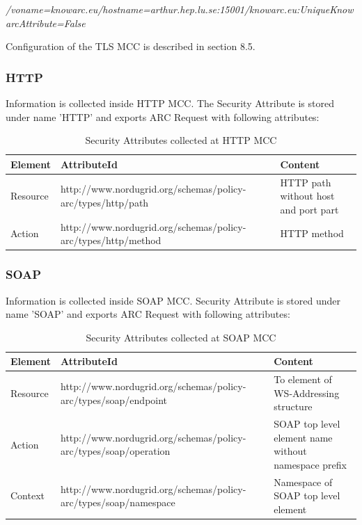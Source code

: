 \documentclass{article}                            %
\begin{document}
\emph{/voname=knowarc.eu/hostname=arthur.hep.lu.se:15001/knowarc.eu:UniqueKnowarcAttribute=False}

Configuration of the TLS MCC is described in section 8.5.



\subsubsection{HTTP} %
\label{subsubsec:sec_attr_HTTP}
Information is collected inside HTTP MCC. The Security Attribute is stored under name 'HTTP' and exports ARC Request with following attributes:

\begin{table}[ht]
\caption{Security Attributes collected at HTTP MCC}
\centering
\begin{tabular}{| l | p{7cm} | p{5cm} |}
\hline
\textbf{Element} & \textbf{AttributeId} & \textbf{Content} \\ \hline
Resource & http://www.nordugrid.org/schemas/policy-arc/types/http/path & HTTP path without host and port part \\ \hline
Action & http://www.nordugrid.org/schemas/policy-arc/types/http/method & HTTP method \\ \hline
\end{tabular}
\label{table:http_attr}
\end{table}


\subsubsection{SOAP} %
\label{subsubsec:sec_attr_SOAP}
Information is collected inside SOAP MCC. Security Attribute is stored under name 'SOAP' and exports ARC Request with following attributes:

\begin{table}[ht]
\caption{Security Attributes collected at SOAP MCC}
\centering
\begin{tabular}{| l | p{7cm} | p{5cm} |}
\hline
\textbf{Element} & \textbf{AttributeId} & \textbf{Content} \\ \hline
Resource & http://www.nordugrid.org/schemas/policy-arc/types/soap/endpoint & To element of WS-Addressing structure \\ \hline
Action & http://www.nordugrid.org/schemas/policy-arc/types/soap/operation & SOAP top level element name without namespace prefix \\ \hline
Context & http://www.nordugrid.org/schemas/policy-arc/types/soap/namespace & Namespace of SOAP top level element \\ \hline
\end{tabular}
\label{table:soap_attr}
\end{table}
\end{document}
